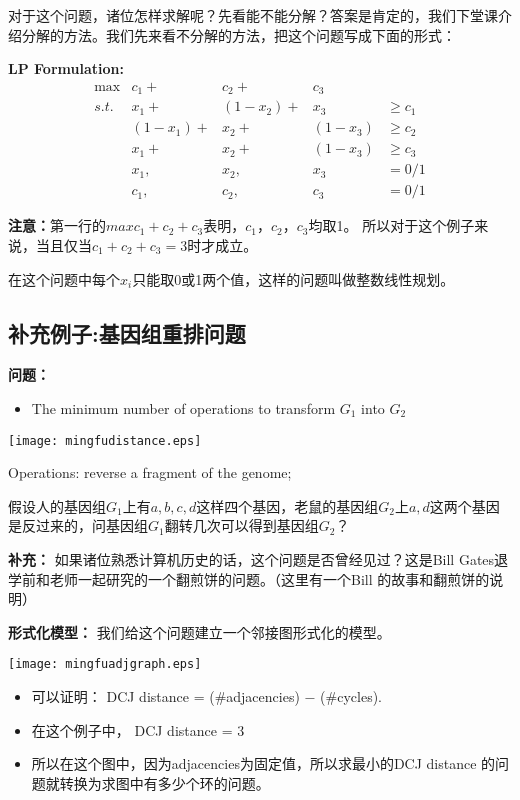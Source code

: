对于这个问题，诸位怎样求解呢？先看能不能分解？答案是肯定的，我们下堂课介绍分解的方法。我们先来看不分解的方法，把这个问题写成下面的形式：

\textbf{LP Formulation:}
\[
\begin{array}{rrrrl}
 \max & c_1 +&  c_2 +& c_3 & \\
 s.t. & x_1 +& (1-x_2) +& x_3 & \geq c_1 \\
      & (1-x_1) +&  x_2 +& (1-x_3) & \geq c_2 \\
      & x_1 +&  x_2 +& (1-x_3) & \geq c_3 \\
      & x_1 ,& x_2 ,& x_3 & = 0/1 \\
      & c_1 ,& c_2 ,& c_3 & = 0/1
\end{array} \nonumber
\]

\textbf{注意：}第一行的$max  c_1 +  c_2 + c_3 $表明，$c_1，c_2 ，c_3$均取1。 所以对于这个例子来说，当且仅当$c_1+c_2+c_3=3$时才成立。


在这个问题中每个$x_{i}$只能取0或1两个值，这样的问题叫做整数线性规划。

\subsection{补充例子:基因组重排问题}
\textbf{问题：}
\begin{itemize}
	\item The minimum number of operations to transform $G_1$ into $G_2$
	\end{itemize}
	\vspace{0.2cm}
	\begin{center}
		\texttt{[image: mingfudistance.eps]}
	\end{center}
	Operations:  reverse a fragment of the genome;


假设人的基因组$G_1$上有$a,b,c,d$这样四个基因，老鼠的基因组$G_2$上$a,d$这两个基因是反过来的，问基因组$G_1$翻转几次可以得到基因组$G_2$？

\textbf{补充：}
如果诸位熟悉计算机历史的话，这个问题是否曾经见过？这是Bill Gates退学前和老师一起研究的一个翻煎饼的问题。（这里有一个Bill 的故事和翻煎饼的说明）


\textbf{形式化模型：}
我们给这个问题建立一个邻接图形式化的模型。
\begin{center}
	\texttt{[image: mingfuadjgraph.eps]}
\end{center}
\begin{itemize}
	\item 可以证明： DCJ distance = (\#adjacencies) $-$ (\#cycles).
	\item 在这个例子中， DCJ distance = 3
	\item 所以在这个图中，因为adjacencies为固定值，所以求最小的DCJ distance 的问题就转换为求图中有多少个环的问题。
\end{itemize}

